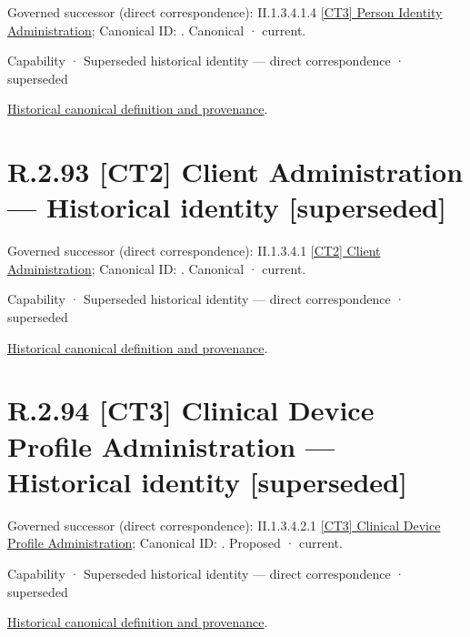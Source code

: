 {\small Governed successor (direct correspondence): II.1.3.4.1.4 \hyperref[element:6c3de7750ef1436cad6a9533731782b6]{[CT3] Person Identity Administration}; Canonical ID: \texttt{}. Canonical · current.}\par
\label{element:7550fd5b17e643118fa76d2616e1ba20}
{\small Capability · Superseded historical identity — direct correspondence · superseded}\par
\href{../../../../continuum/strategy/capability/7550fd5b17e643118fa76d2616e1ba20.md}{Historical canonical definition and provenance}.\par
\section*{R.2.93 [CT2] Client Administration — Historical identity [superseded]}
\label{navigation:R.2.93}

{\small Governed successor (direct correspondence): II.1.3.4.1 \hyperref[element:f0885472cced4bccbcce1568bf0360dc]{[CT2] Client Administration}; Canonical ID: \texttt{}. Canonical · current.}\par
\label{element:70d2a44a0442441f8b306b82b297bb8a}
{\small Capability · Superseded historical identity — direct correspondence · superseded}\par
\href{../../../../continuum/strategy/capability/70d2a44a0442441f8b306b82b297bb8a.md}{Historical canonical definition and provenance}.\par
\section*{R.2.94 [CT3] Clinical Device Profile Administration — Historical identity [superseded]}
\label{navigation:R.2.94}

{\small Governed successor (direct correspondence): II.1.3.4.2.1 \hyperref[element:d0a1ba80c790476ea6042290eb7ea09e]{[CT3] Clinical Device Profile Administration}; Canonical ID: \texttt{}. Proposed · current.}\par
\label{element:e8c72952da144d6883caba7fd2afb88d}
{\small Capability · Superseded historical identity — direct correspondence · superseded}\par
\href{../../../../continuum/strategy/capability/e8c72952da144d6883caba7fd2afb88d.md}{Historical canonical definition and provenance}.\par
